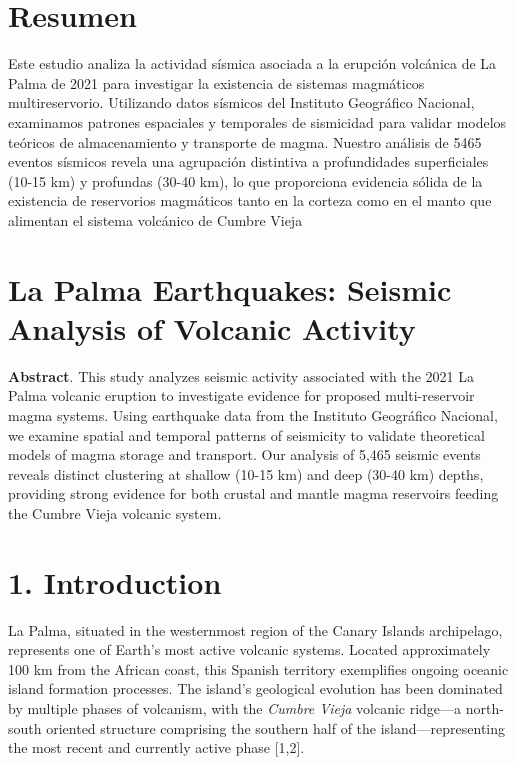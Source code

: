 \documentclass[
  letterpaper,
]{book}
\begin{document}
\label{resumen}

\chapter{Resumen}\label{resumen}

Este estudio analiza la actividad sísmica asociada a la erupción
volcánica de La Palma de 2021 para investigar la existencia de sistemas
magmáticos multireservorio. Utilizando datos sísmicos del Instituto
Geográfico Nacional, examinamos patrones espaciales y temporales de
sismicidad para validar modelos teóricos de almacenamiento y transporte
de magma. Nuestro análisis de 5465 eventos sísmicos revela una
agrupación distintiva a profundidades superficiales (10-15 km) y
profundas (30-40 km), lo que proporciona evidencia sólida de la
existencia de reservorios magmáticos tanto en la corteza como en el
manto que alimentan el sistema volcánico de Cumbre Vieja

\label{abstract}

\chapter{La Palma Earthquakes: Seismic Analysis of Volcanic
Activity}\label{la-palma-earthquakes-seismic-analysis-of-volcanic-activity}

\textbf{Abstract}. This study analyzes seismic activity associated with
the 2021 La Palma volcanic eruption to investigate evidence for proposed
multi-reservoir magma systems. Using earthquake data from the Instituto
Geográfico Nacional, we examine spatial and temporal patterns of
seismicity to validate theoretical models of magma storage and
transport. Our analysis of 5,465 seismic events reveals distinct
clustering at shallow (10-15 km) and deep (30-40 km) depths, providing
strong evidence for both crustal and mantle magma reservoirs feeding the
Cumbre Vieja volcanic system.


\chapter{1. Introduction}\label{introduction}

La Palma, situated in the westernmost region of the Canary Islands
archipelago, represents one of Earth's most active volcanic systems.
Located approximately 100 km from the African coast, this Spanish
territory exemplifies ongoing oceanic island formation processes. The
island's geological evolution has been dominated by multiple phases of
volcanism, with the \emph{Cumbre Vieja} volcanic ridge---a north-south
oriented structure comprising the southern half of the
island---representing the most recent and currently active phase
{[}1,2{]}.
\end{document}
